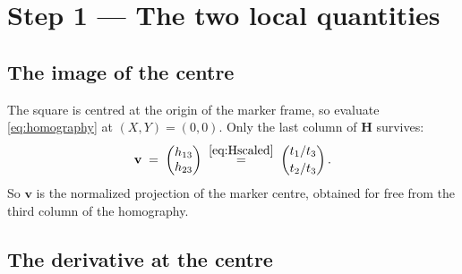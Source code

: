 \documentclass[11pt,a4paper]{article}
\theoremstyle{remark}
\newcommand{\Hmat}{\mathbf{H}}
\newcommand{\vvec}{\mathbf{v}}
\begin{document}
\section{Step 1 --- The two local quantities}

\subsection{The image of the centre}

The square is centred at the origin of the marker frame, so evaluate
\eqref{eq:homography} at $(X,Y) = (0,0)$. Only the last column of $\Hmat$
survives:
\begin{equation}
  \vvec \;=\; \begin{pmatrix} h_{13} \\ h_{23} \end{pmatrix}
  \;\overset{\eqref{eq:Hscaled}}{=}\;
  \begin{pmatrix} t_1/t_3 \\[2pt] t_2/t_3 \end{pmatrix}.
  \label{eq:vdef}
\end{equation}
So $\vvec$ is the normalized projection of the marker centre, obtained for free
from the third column of the homography.

\subsection{The derivative at the centre}
\end{document}
